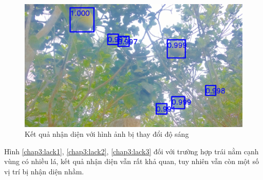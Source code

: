 \begin{center}
    \begin{figure}[H]
    \centering
    \includegraphics[width=0.6\columnwidth]{images/chap3/demo_012.jpg}
    \caption{Kết quả nhận diện với hình ảnh bị thay đổi độ sáng}
    \label{chap3:good6}
    \end{figure}
\end{center}

Hình \ref{chap3:lack1}, \ref{chap3:lack2}, \ref{chap3:lack3} đối với trường hợp trái nằm cạnh vùng có nhiều lá, kết quả nhận diện vẫn rất khả quan, tuy nhiên vẫn còn một số vị trí bị nhận diện nhầm.

